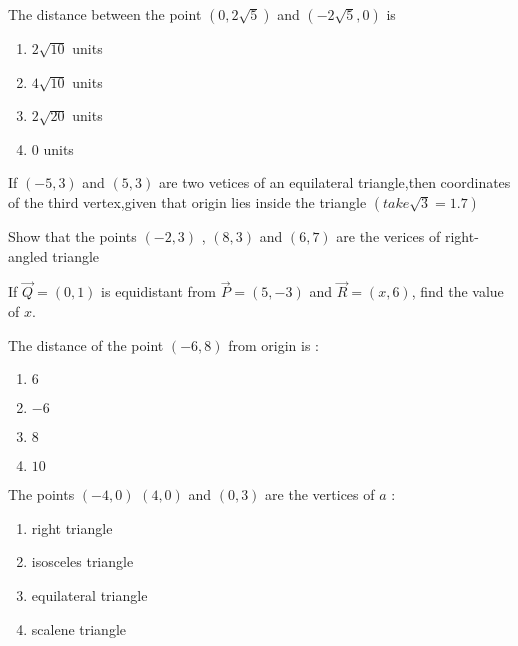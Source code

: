 
\item The distance between the point $(0,2\sqrt{5})$ and $(-2\sqrt{5},0)$ is 
\begin{enumerate}
\item $2\sqrt{10}$ units
\item $4\sqrt{10}$ units
\item $2\sqrt{20}$ units
\item $0$ units
\end{enumerate}

\item If $(-5,3)$ and $(5,3)$ are two vetices of an equilateral triangle,then coordinates of the third vertex,given that origin lies inside the triangle $(take \sqrt{3}=1.7)$
\item Show that the points $(-2,3)$ , $(8,3)$ and $(6,7)$ are the verices of right-angled triangle
\item If $\vec{Q} =(0,1)$ is equidistant from $\vec{P} = (5,-3)$ and $\vec{R} =(x,6)$, find the value of $x$.
\item The distance of the point $(-6,8)$ from origin is :
\begin{enumerate}
\item $6$
\item $-6$
\item $8$
\item $10$
\end{enumerate}

\item The points $(-4,0)$ $(4,0)$ and $(0,3)$ are the vertices of $a$ :
\begin{enumerate}
\item right triangle
\item isosceles triangle
\item equilateral triangle
\item scalene triangle
\end{enumerate}


